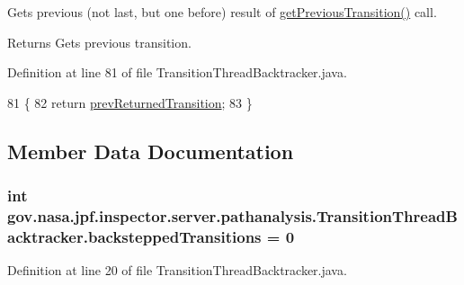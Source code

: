 Gets previous (not last, but one before) result of \hyperlink{classgov_1_1nasa_1_1jpf_1_1inspector_1_1server_1_1pathanalysis_1_1_transition_thread_backtracker_ad9effffddf4f1f6fd2687739e7dc1d87}{get\+Previous\+Transition()} call. 

\begin{DoxyReturn}{Returns}
Gets previous transition. 
\end{DoxyReturn}


Definition at line 81 of file Transition\+Thread\+Backtracker.\+java.


\begin{DoxyCode}
81                                                 \{
82     \textcolor{keywordflow}{return} \hyperlink{classgov_1_1nasa_1_1jpf_1_1inspector_1_1server_1_1pathanalysis_1_1_transition_thread_backtracker_a188efd2f5bf48d8c71943789a66b3219}{prevReturnedTransition};
83   \}
\end{DoxyCode}


\subsection{Member Data Documentation}
\subsubsection[{\texorpdfstring{backstepped\+Transitions}{backsteppedTransitions}}]{\setlength{\rightskip}{0pt plus 5cm}int gov.\+nasa.\+jpf.\+inspector.\+server.\+pathanalysis.\+Transition\+Thread\+Backtracker.\+backstepped\+Transitions = 0\hspace{0.3cm}{\ttfamily [private]}}\hypertarget{classgov_1_1nasa_1_1jpf_1_1inspector_1_1server_1_1pathanalysis_1_1_transition_thread_backtracker_abfd6313c73f25511f92f2e6a755c335c}{}\label{classgov_1_1nasa_1_1jpf_1_1inspector_1_1server_1_1pathanalysis_1_1_transition_thread_backtracker_abfd6313c73f25511f92f2e6a755c335c}


Definition at line 20 of file Transition\+Thread\+Backtracker.\+java.

